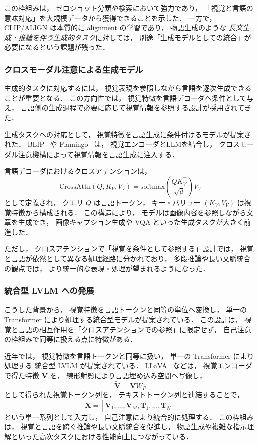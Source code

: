 \documentclass[a4j,12pt,dvipdfmx]{jsreport}
\begin{document}
この枠組みは，
ゼロショット分類や検索において強力であり，
「視覚と言語の意味対応」を大規模データから獲得できることを示した．
一方で，
CLIP/ALIGN は本質的に alignment の学習であり，
物語生成のような \emph{長文生成・推論を伴う生成的タスク}に対しては，
別途「生成モデルとしての統合」が必要になるという課題が残った．

\subsubsection{クロスモーダル注意による生成モデル}

生成的タスクに対応するには，
視覚表現を参照しながら言語を逐次生成できることが重要となる．
この方向性では，
視覚特徴を言語デコーダへ条件として与え，
言語側の生成過程で必要に応じて視覚情報を参照する設計が採用されてきた．

生成タスクへの対応として，
視覚特徴を言語生成に条件付けるモデルが提案された．
BLIP~\cite{li2022blip} や
Flamingo~\cite{alayrac2022flamingo} は，
視覚エンコーダとLLMを結合し，
クロスモーダル注意機構によって視覚情報を言語生成に注入する．

言語デコーダにおけるクロスアテンションは，
\begin{equation}
   \mathrm{CrossAttn}(Q,K_V,V_V)
   =
   \mathrm{softmax}
   \left(
   \frac{QK_V^\top}{\sqrt{d}}
   \right)V_V
\end{equation}
として定義され，
クエリ $Q$ は言語トークン，
キー・バリュー $(K_V,V_V)$ は視覚特徴から構成される．
この構造により，
モデルは画像内容を参照しながら文章を生成でき，
画像キャプション生成や VQA といった生成タスクが大きく前進した．

ただし，
クロスアテンションで「視覚を条件として参照する」設計では，
視覚と言語が依然として異なる処理経路に分かれており，
多段推論や長い文脈統合の観点では，
より統一的な表現・処理が望まれるようになった．

\subsubsection{統合型 LVLM への発展}

こうした背景から，
視覚特徴を言語トークンと同等の単位へ変換し，
単一の Transformer により処理する統合型モデルが提案されている．
この設計は，
視覚と言語の相互作用を「クロスアテンションでの参照」に限定せず，
自己注意の枠組みで同等に扱える点に特徴がある．

近年では，
視覚特徴を言語トークンと同等に扱い，
単一の Transformer により処理する
統合型 LVLM が提案されている．
LLaVA~\cite{liu2024llava} などは，
視覚エンコーダで得た特徴 $\mathbf{V}$ を，
線形射影により言語埋め込み空間へ写像し，
\begin{equation}
   \tilde{\mathbf{V}} = \mathbf{V} W_P
\end{equation}
として得られた視覚トークン列を，
テキストトークン列と連結することで，
\begin{equation}
   \mathbf{X}
   =
   [\tilde{\mathbf{V}}_1,\ldots,\tilde{\mathbf{V}}_M,\mathbf{T}_1,\ldots,\mathbf{T}_N]
\end{equation}
という単一系列として入力し，
自己注意により統合的に処理する．
この枠組みは，
視覚と言語を跨ぐ推論や長い文脈統合を促進し，
物語生成や複雑な指示理解といった高次タスクにおける性能向上につながっている．
\end{document}
